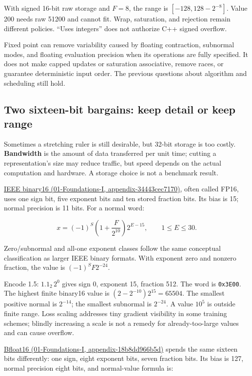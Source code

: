 With signed 16-bit raw storage and \(F=8\), the range is \([-128,128-2^{-8}]\). Value 200 needs raw 51200 and cannot fit. Wrap, saturation, and rejection remain different policies. ``Uses integers'' does not authorize C++ signed overflow.

Fixed point can remove variability caused by floating contraction, subnormal modes, and floating evaluation precision when its operations are fully specified. It does not make capped updates or saturation associative, remove races, or guarantee deterministic input order. The previous questions about algorithm and scheduling still hold.

\subsection{Two sixteen-bit bargains: keep detail or keep range}\label{05-engine-i-ch001-two-sixteen-bit-bargains-keep-detail-or-keep-range}

Sometimes a stretching ruler is still desirable, but 32-bit storage is too costly. \textbf{Bandwidth} is the amount of data transferred per unit time; cutting a representation's size may reduce traffic, but speed depends on the actual computation and hardware. A storage choice is not a benchmark result.

\href{../01-Foundations-I/main.pdf\#nameddest=appendix-34443cec7170}{IEEE binary16 (01-Foundations-I, appendix-34443cec7170)}, often called FP16, uses one sign bit, five exponent bits and ten stored fraction bits. Its bias is 15; normal precision is 11 bits. For a normal word:

\[
x=(-1)^S\left(1+\frac{F}{2^{10}}\right)2^{E-15},
\qquad 1\le E\le30.
\]

Zero/subnormal and all-one exponent classes follow the same conceptual classification as larger IEEE binary formats. With exponent zero and nonzero fraction, the value is \((-1)^SF2^{-24}\).

Encode 1.5: \(1.1_2\,2^0\) gives sign 0, exponent 15, fraction 512. The word is \texttt{0x3E00}. The highest finite binary16 value is \((2-2^{-10})2^{15}=65504\). The smallest positive normal is \(2^{-14}\); the smallest subnormal is \(2^{-24}\). A value \(10^5\) is outside finite range. Loss scaling addresses tiny gradient visibility in some training schemes; blindly increasing a scale is not a remedy for already-too-large values and can cause overflow.

\href{../01-Foundations-I/main.pdf\#nameddest=appendix-18b8dd966b5d}{Bfloat16 (01-Foundations-I, appendix-18b8dd966b5d)} spends the same sixteen bits differently: one sign, eight exponent bits, seven fraction bits. Its bias is 127, normal precision eight bits, and normal-value formula is:

